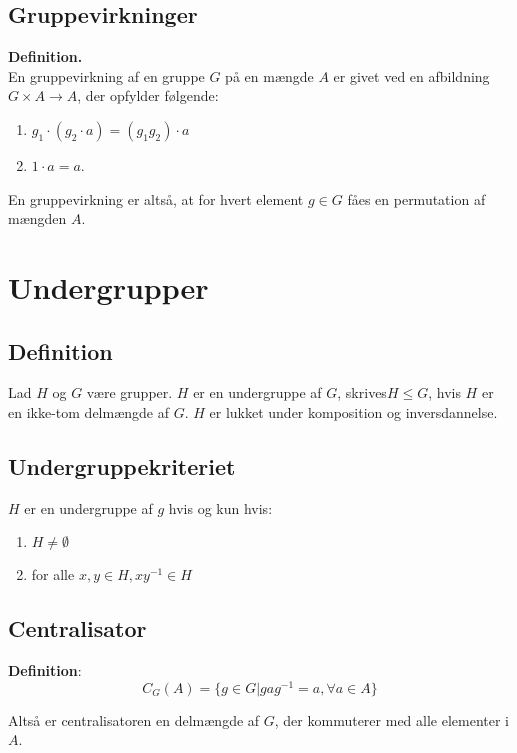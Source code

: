 \documentclass[11pt]{article}
\begin{document}
\subsection*{Gruppevirkninger}
\textbf{Definition.}\\
En gruppevirkning af en gruppe $G$ på en mængde $A$ er givet ved en afbildning $G \times A \to A$, der opfylder følgende:\\
\begin{enumerate}
  \item $g_1 \cdot (g_2 \cdot a) = (g_1 g_2) \cdot a$\\
  \item $1 \cdot a = a$.
\end{enumerate}
En gruppevirkning er altså, at for hvert element $g \in G$ fåes en permutation af mængden $A$.
\section*{Undergrupper}

\subsection*{Definition}
Lad $H$ og $G$ være grupper. $H$ er en undergruppe af $G$, skrives$H \leq G$, hvis $H$ er en ikke-tom delmængde af $G$. $H$ er lukket under komposition og inversdannelse.



\subsection*{Undergruppekriteriet}

$H$ er en undergruppe af $g$ hvis og kun hvis:
\begin{enumerate}
  \item $H \neq \emptyset$\\
  \item for alle $x, y \in H, x y^{-1} \in H$
\end{enumerate}

\subsection*{Centralisator}
\textbf{Definition}:\\
$$C_G(A) = \{ g \in G | g a g^{-1} = a,  \forall{a} \in A \}$$

Altså er centralisatoren en delmængde af $G$, der kommuterer med alle elementer i $A$.
\end{document}
